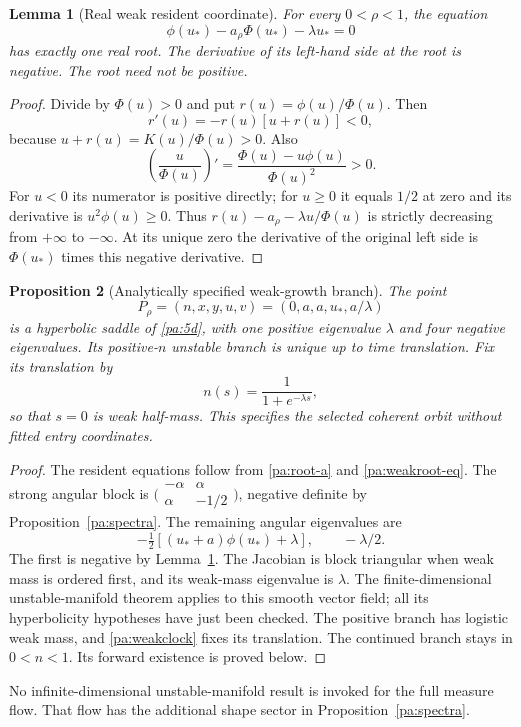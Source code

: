 \documentclass[11pt]{article}
\numberwithin{equation}{section}
\newtheorem{proposition}{Proposition}[section]
\newtheorem{lemma}[proposition]{Lemma}
\theoremstyle{definition}
\theoremstyle{remark}
\newcommand{\1}{\mathbf 1}
\begin{document}
\begin{lemma}[Real weak resident coordinate]\label{pa:weakroot}
For every $0<\rho<1$, the equation
\begin{equation}\label{pa:weakroot-eq}
 \phi(u_*)-a_\rho\Phi(u_*)-\lambda u_*=0
\end{equation}
has exactly one real root. The derivative of its left-hand side at the root
is negative. The root need not be positive.
\end{lemma}
\begin{proof}
Divide by $\Phi(u)>0$ and put $r(u)=\phi(u)/\Phi(u)$. Then
\[
 r'(u)=-r(u)[u+r(u)]<0,
\]
because $u+r(u)=K(u)/\Phi(u)>0$. Also
\[
 \left(\frac u{\Phi(u)}\right)'
 =\frac{\Phi(u)-u\phi(u)}{\Phi(u)^2}>0.
\]
For $u<0$ its numerator is positive directly; for $u\ge0$ it equals
$1/2$ at zero and its derivative is $u^2\phi(u)\ge0$.
Thus $r(u)-a_\rho-\lambda u/\Phi(u)$ is strictly decreasing from
$+\infty$ to $-\infty$. At its unique zero the derivative of the original
left side is $\Phi(u_*)$ times this negative derivative.
\end{proof}

\begin{proposition}[Analytically specified weak-growth branch]\label{pa:branch}
The point
\[
 P_\rho=(n,x,y,u,v)=(0,a,a,u_*,a/\lambda)
\]
is a hyperbolic saddle of \eqref{pa:5d}, with one positive eigenvalue
$\lambda$ and four negative eigenvalues. Its positive-$n$ unstable branch
is unique up to time translation. Fix its translation by
\begin{equation}\label{pa:weakclock}
 n(s)=\frac1{1+e^{-\lambda s}},
\end{equation}
so that $s=0$ is weak half-mass. This specifies the selected coherent orbit
without fitted entry coordinates.
\end{proposition}
\begin{proof}
The resident equations follow from \eqref{pa:root-a} and
\eqref{pa:weakroot-eq}. The strong angular block is
$\bigl(\begin{smallmatrix}-\alpha&\alpha\\\alpha&-1/2\end{smallmatrix}\bigr)$,
negative definite by Proposition~\ref{pa:spectra}. The remaining angular
eigenvalues are
\[
 -\tfrac12[(u_*+a)\phi(u_*)+\lambda],\qquad -\lambda/2.
\]
The first is negative by Lemma~\ref{pa:weakroot}. The Jacobian is block
triangular when weak mass is ordered first, and its weak-mass eigenvalue is
$\lambda$. The finite-dimensional unstable-manifold theorem applies to
this smooth vector field; all its hyperbolicity hypotheses have just been
checked. The positive branch has logistic weak mass, and
\eqref{pa:weakclock} fixes its translation. The continued branch stays in
$0<n<1$. Its forward existence is proved below.
\end{proof}
No infinite-dimensional unstable-manifold result is invoked for the full
measure flow. That flow has the additional shape sector in
Proposition~\ref{pa:spectra}.
\end{document}
